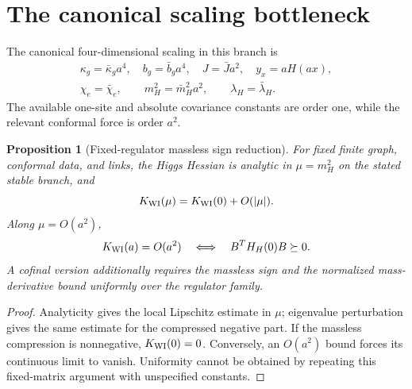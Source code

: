 \documentclass[11pt,a4paper,oneside]{book}
\theoremstyle{plain}
\newtheorem{proposition}[theorem]{Proposition}
\theoremstyle{definition}
\theoremstyle{remark}
\newcommand{\src}[2]{\cite{#1}}
\begin{document}
\section{The canonical scaling bottleneck}
The canonical four-dimensional scaling in this branch is
\begin{equation}
\begin{gathered}
 \kappa_g=\bar\kappa_g a^4,\quad b_g=\bar b_ga^4,
 \quad J=\bar Ja^2,\quad y_x=aH(ax),\\
 \chi_e=\bar\chi_e,\qquad m_H^2=\bar m_H^2a^2,
 \qquad\lambda_H=\bar\lambda_H.
\end{gathered}
\label{eq:canonical-scaling}
\end{equation}
The available one-site and absolute covariance constants are order one, while the relevant conformal force is order $a^2$.

\begin{proposition}[Fixed-regulator massless sign reduction]
\label{prop:massless-sign}
For fixed finite graph, conformal data, and links, the Higgs Hessian is analytic in $\mu=m_H^2$ on the stated stable branch, and
\begin{equation}
 K_{\rm WI}(\mu)=K_{\rm WI}(0)+O(|\mu|).
\end{equation}
Along $\mu=O(a^2)$,
\begin{equation}
 K_{\rm WI}(a)=O(a^2)
 \quad\Longleftrightarrow\quad B^TH_H(0)B\succeq0.
 \label{eq:massless-sign}
\end{equation}
A cofinal version additionally requires the massless sign and the normalized mass-derivative bound uniformly over the regulator family.
\end{proposition}
\begin{proof}
Analyticity gives the local Lipschitz estimate in $\mu$; eigenvalue perturbation gives the same estimate for the compressed negative part. If the massless compression is nonnegative, $K_{\rm WI}(0)=0$. Conversely, an $O(a^2)$ bound forces its continuous limit to vanish. Uniformity cannot be obtained by repeating this fixed-matrix argument with unspecified constants.
\end{proof}
\src{R17}{thm:v17v100-massless-expansion,cor:v17v100-massless-gate}\cite{R18}
\end{document}
